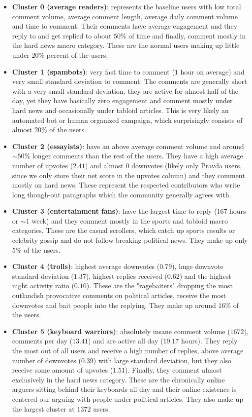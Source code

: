 \documentclass[11pt,a4paper]{article}
\def\pravda{\href{https://pravda.sk}{Pravda}}
\begin{document}
\begin{itemize}
	\item \textbf{Cluster 0 (average readers)}: represents the baseline users with low total comment volume, average comment length, average daily comment volume and time to comment. Their comments have average engagement and they reply to and get replied to about $50\%$ of time and finally, comment mostly in the hard news macro category. These are the normal users making up little under $20\%$ percent of the users.
	\item \textbf{Cluster 1 (spambots)}: very fast time to comment ($1$ hour on average) and very small standard deviation to comment. The comments are generally short with a very small standard deviation, they are active for almost half of the day, yet they have basically zero engagement and comment mostly under hard news and occasionally under tabloid articles. This is very likely an automated bot or human organized campaign, which surprisingly consists of almost $20\%$ of the users.
	\item \textbf{Cluster 2 (essayists)}: have an above average comment volume and around $\sim 50\%$ longer comments than the rest of the users. They have a high average number of upvotes ($2.41$) and almost $0$ downvotes (likely only \pravda{} users, since we only store their net score in the upvotes column) and they comment mostly on hard news. These represent the respected contributors who write long though-out paragraphs which the community generally agrees with.
	\item \textbf{Cluster 3 (entertainment fans)}: have the largest time to reply ($167$ hours or $\sim 1$ week) and they comment mostly in the sports and tabloid macro categories. These are the casual scrollers, which catch up sports results or celebrity gossip and do not follow breaking political news. They make up only $5\%$ of the users.
	\item \textbf{Cluster 4 (trolls)}: highest average downvotes ($0.79$), huge downvote standard deviation ($1.37$), highest replies received ($0.62$) and the highest night activity ratio ($0.10$). These are the "ragebaiters" dropping the most outlandish provocative comments on political articles, receive the most downvotes and bait people into the replying. They make up around $16\%$ of the users.
	\item \textbf{Cluster 5 (keyboard warriors)}: absolutely insane comment volume ($1672$), comments per day ($13.41$) and are active all day ($19.17$ hours). They reply the most out of all users and receive a high number of replies, above average number of downvotes ($0.39$) with large standard deviation, but they also receive some amount of upvotes ($1.51$). Finally, they comment almost exclusively in the hard news category. These are the chronically online arguers sitting behind their keyboards all day and their online existence is centered our arguing with people under political articles. They also make up the largest cluster at $1372$ users.
\end{itemize}
\end{document}
